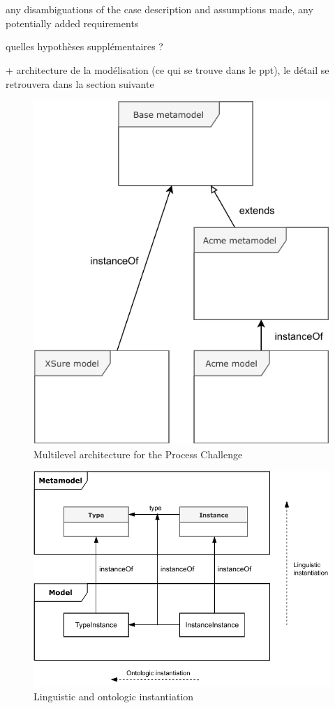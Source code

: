 

~\\
~\\

any disambiguations of the  case  description and assumptions made, any potentially added requirements

quelles hypothèses supplémentaires ? 

+ architecture de la modélisation (ce qui se trouve dans le ppt), le détail se retrouvera dans la section suivante



\begin{figure}
    \centering
    \includegraphics[width=0.7 \columnwidth]{Figures/MultilevelArchitecture.pdf}
    \caption{Multilevel architecture for the Process Challenge}
    \label{fig:MultilevelArchitecture}
\end{figure}

\begin{figure}
    \centering
    \includegraphics[width=1.0 \columnwidth]{Figures/Instantiation.pdf}
    \caption{Linguistic and ontologic instantiation}
    \label{fig:LinguisticAndOntologicInstantiation}
\end{figure}



